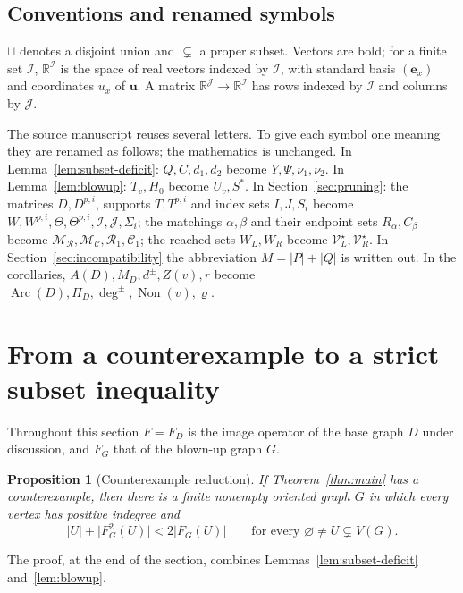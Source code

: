 \documentclass[11pt]{article}
\newtheorem{proposition}[theorem]{Proposition}
\theoremstyle{remark}
\newcommand{\abs}[1]{\lvert #1\rvert}
\DeclareMathOperator{\Arc}{Arc}
\DeclareMathOperator{\Non}{Non}
\newcommand{\R}{\mathbb R}
\newcommand{\cR}{\mathcal R}
\newcommand{\cC}{\mathcal C}
\newcommand{\cM}{\mathcal M}
\newcommand{\cV}{\mathcal V}
\newcommand{\bu}{\mathbf u}
\newcommand{\be}{\mathbf e}
\begin{document}
\subsection{Conventions and renamed symbols}

$\sqcup$ denotes a disjoint union and $\subsetneq$ a proper subset. Vectors
are bold; for a finite set $\mathcal I$, $\R^{\mathcal I}$ is the space of
real vectors indexed by $\mathcal I$, with standard basis $(\be_x)$ and
coordinates $u_x$ of $\bu$. A matrix $\R^{\mathcal J}\to\R^{\mathcal I}$ has
rows indexed by $\mathcal I$ and columns by $\mathcal J$.

The source manuscript reuses several letters. To give each symbol one meaning
they are renamed as follows; the mathematics is unchanged.
In Lemma~\ref{lem:subset-deficit}: $Q,C,d_1,d_2$ become
$Y,\Psi,\nu_1,\nu_2$. In Lemma~\ref{lem:blowup}: $T_v,H_0$ become
$U_v,S^{*}$. In Section~\ref{sec:pruning}: the matrices $D,D^{p,i}$, supports
$T,T^{p,i}$ and index sets $I,J,S_i$ become
$W,W^{p,i},\Theta,\Theta^{p,i},\mathcal I,\mathcal J,\Sigma_i$; the matchings
$\alpha,\beta$ and their endpoint sets $R_\alpha,C_\beta$ become
$\cM_{\cR},\cM_{\cC},\cR_1,\cC_1$; the reached sets $W_L,W_R$ become
$\cV_L^{\star},\cV_R^{\star}$. In Section~\ref{sec:incompatibility} the
abbreviation $M=\abs P+\abs Q$ is written out. In the corollaries,
$A(D),M_D,d^{\pm},Z(v),r$ become
$\Arc(D),\Pi_D,\deg^{\pm},\Non(v),\varrho$.

\section{From a counterexample to a strict subset inequality}
\label{sec:reduction}

Throughout this section $F=F_D$ is the image operator of the base graph $D$
under discussion, and $F_G$ that of the blown-up graph $G$.

\begin{proposition}[Counterexample reduction]
\label{prop:counterexample-reduction}
If Theorem~\ref{thm:main} has a counterexample, then there is a finite
nonempty oriented graph $G$ in which every vertex has positive indegree
and
\begin{equation}
\label{eq:strict-subset-growth}
  \abs{U}+\abs{F_G^2(U)}<2\abs{F_G(U)}
  \qquad\text{for every }\varnothing\ne U\subsetneq V(G).
\end{equation}
\end{proposition}

The proof, at the end of the section, combines
Lemmas~\ref{lem:subset-deficit} and~\ref{lem:blowup}.
\end{document}
